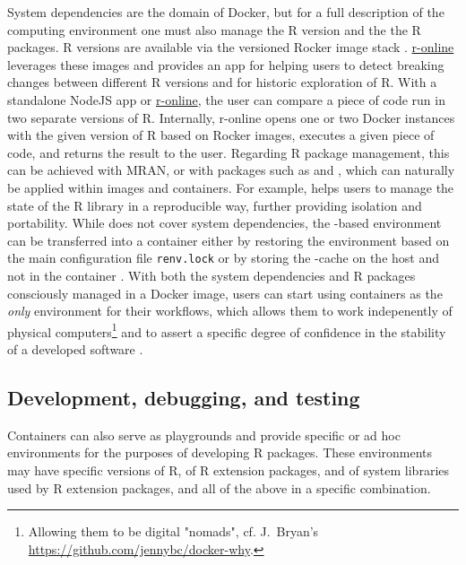 System dependencies are the domain of Docker, but for a full description
of the computing environment one must also manage the R version and the
the R packages. R versions are available via the versioned Rocker image
stack \citep{RJ-2017-065}.
\href{https://github.com/ColinFay/ronline}{r-online} leverages these
images and provides an app for helping users to detect breaking changes
between different R versions and for historic exploration of R. With a
standalone NodeJS app or
\href{https://srv.colinfay.me/r-online}{r-online}, the user can compare
a piece of code run in two separate versions of R. Internally, r-online
opens one or two Docker instances with the given version of R based on
Rocker images, executes a given piece of code, and returns the result to
the user. Regarding R package management, this can be achieved with
MRAN, or with packages such as 
\citep{cran_checkpoint} and  \citep{renv2019}, which can
naturally be applied within images and containers. For example,
 helps users to manage the state of the R library in a
reproducible way, further providing isolation and portability. While
 does not cover system dependencies, the -based
environment can be transferred into a container either by restoring the
environment based on the main configuration file \texttt{renv.lock} or
by storing the -cache on the host and not in the container
\citep{ushey_using_2019}. With both the system dependencies and R
packages consciously managed in a Docker image, users can start using
containers as the \emph{only} environment for their workflows, which
allows them to work indepenently of physical
computers\footnote{Allowing them to be digital "nomads", cf. J.~Bryan's \href{https://github.com/jennybc/docker-why}{https://github.com/jennybc/docker-why}.}
and to assert a specific degree of confidence in the stability of a
developed software
\citep[cf. \texttt{README.Rmd} in][]{marwick_research_2017}.

\hypertarget{development-debugging-and-testing}{%
\subsection{Development, debugging, and
testing}\label{development-debugging-and-testing}}

\label{development}

Containers can also serve as playgrounds and provide specific or ad hoc
environments for the purposes of developing R packages. These
environments may have specific versions of R, of R extension packages,
and of system libraries used by R extension packages, and all of the
above in a specific combination.

